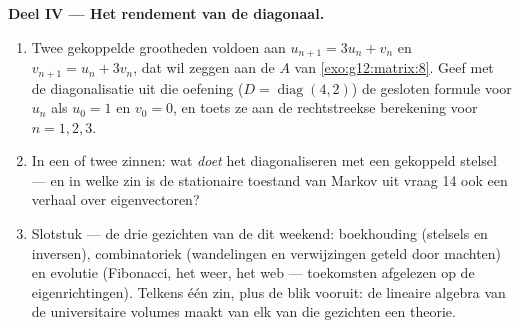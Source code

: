 \begin{problem}
\medskip
\noindent\textbf{Deel IV --- Het rendement van de diagonaal.}
\begin{enumerate}[resume]
  \item Twee gekoppelde grootheden voldoen aan $u_{n+1} = 3u_n + v_n$ en
        $v_{n+1} = u_n + 3v_n$, dat wil zeggen aan de  $A$ van
        \cref{exo:g12:matrix:8}. Geef met de diagonalisatie uit die oefening
        ($D = \operatorname{diag}(4, 2)$) de gesloten formule voor $u_n$ als
        $u_0 = 1$ en $v_0 = 0$, en toets ze aan de rechtstreekse berekening
        voor $n = 1, 2, 3$.
  \item In een of twee zinnen: wat \emph{doet} het diagonaliseren met een
        gekoppeld stelsel --- en in welke zin is de stationaire toestand van
        Markov uit vraag 14 ook een verhaal over eigenvectoren?
  \item Slotstuk --- de drie gezichten van de  dit weekend: boekhouding
        (stelsels en inversen), combinatoriek (wandelingen en verwijzingen
        geteld door machten) en evolutie (Fibonacci, het weer, het web ---
        toekomsten afgelezen op de eigenrichtingen). Telkens één zin, plus de
        blik vooruit: de lineaire algebra van de universitaire volumes maakt
        van elk van die gezichten een theorie.
\end{enumerate}
\end{problem}
